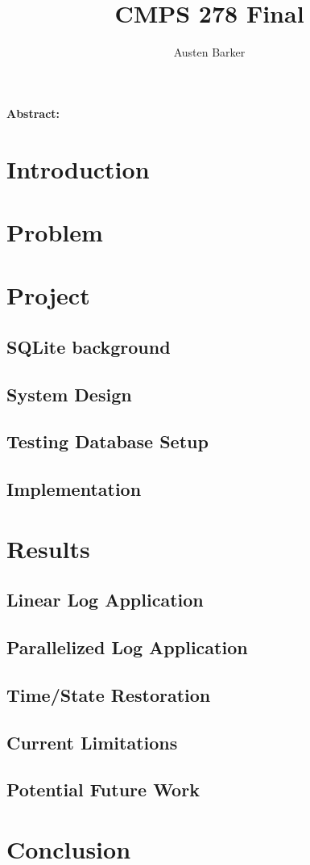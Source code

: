 \documentclass{article}
\begin{document}
\title{CMPS 278 Final}
\author{Austen Barker}
\maketitle

\begin{multicols}{2}

\textbf{Abstract:} 
\section{Introduction}
\section{Problem}
\section{Project}
\subsection{SQLite background}
\subsection{System Design}
\subsection{Testing Database Setup}
\subsection{Implementation}
\section{Results}
\subsection{Linear Log Application}
\subsection{Parallelized Log Application}
\subsection{Time/State Restoration}
\subsection{Current Limitations}
\subsection{Potential Future Work}
\section{Conclusion}



\end{multicols}
\end{document}
